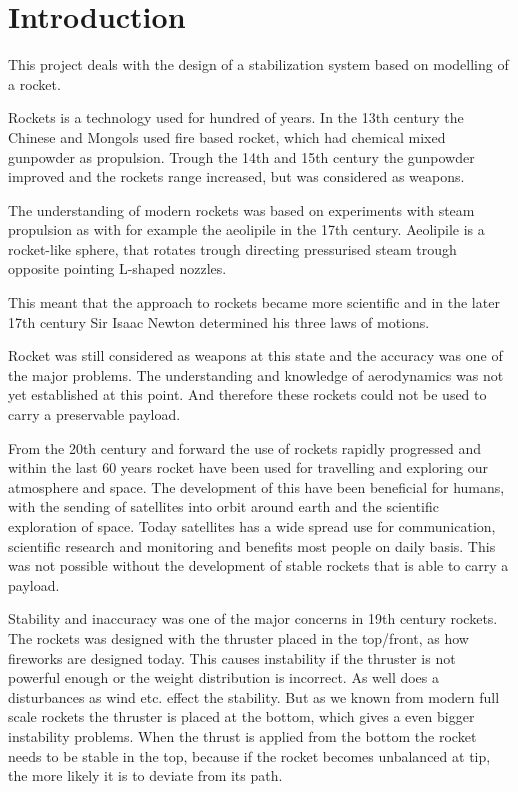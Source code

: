 \chapter{Introduction}
This project deals with the design of a stabilization system based on modelling of a rocket.

Rockets is a technology used for hundred of years. In the 13th century the Chinese and Mongols used fire based rocket, which had chemical mixed gunpowder as propulsion. Trough the 14th and 15th century the gunpowder improved and the rockets range increased, but was considered as weapons.  

The understanding of modern rockets was based on experiments with steam propulsion as with for example the aeolipile in the 17th century. Aeolipile is a rocket-like sphere, that rotates trough directing pressurised steam trough opposite pointing L-shaped nozzles. 

This meant that the approach to rockets became more scientific and in the later 17th century Sir Isaac Newton determined his three laws of motions.

Rocket was still considered as weapons at this state and the accuracy was one of the major problems. The understanding and knowledge of aerodynamics was not yet established at this point. And therefore these rockets could not be used to carry a preservable payload. 


From the 20th century and forward the use of rockets rapidly progressed and within the last 60 years rocket have been used for travelling and exploring our atmosphere and space. The development of this have been beneficial for humans, with the sending of satellites into orbit around earth and the scientific exploration of space. Today satellites has a wide spread use for communication, scientific research and monitoring and benefits most people on daily basis. This was not possible without the development of stable rockets that is able to carry a payload.   

Stability and inaccuracy was one of the major concerns in 19th century rockets. The rockets was designed with the thruster placed in the top/front, as how fireworks are designed today. This causes instability if the thruster is not powerful enough or the weight distribution is incorrect. As well does a disturbances as wind etc. effect the stability. But as we known from modern full scale rockets the thruster is placed at the bottom, which gives a even bigger instability problems. When the thrust is applied from the bottom the rocket needs to be stable in the top, because if the rocket becomes unbalanced at tip, the more likely it is to deviate from its path.  



